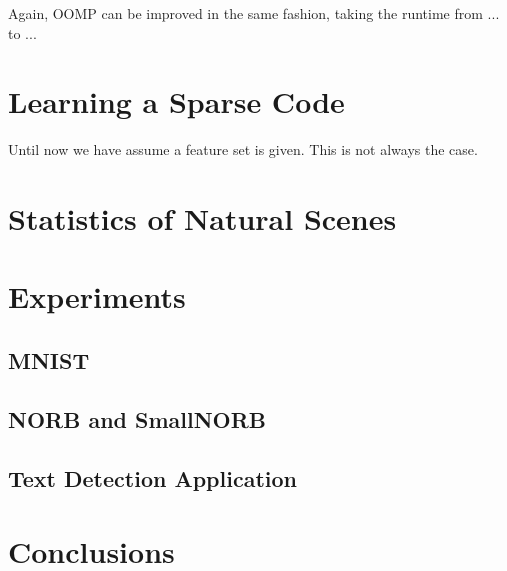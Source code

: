 \documentclass[12pt,a4paper,oneside,english]{UPBThesis}
\begin{document}
Again, OOMP can be improved in the same fashion, taking the runtime from ... to ...

\chapter{Learning a Sparse Code}

Until now we have assume a feature set is given. This is not always the case.

\chapter{Statistics of Natural Scenes}

\chapter{Experiments}

\section{MNIST}

\section{NORB and SmallNORB}

\section{Text Detection Application}

\chapter{Conclusions}




\appendix
\end{document}
